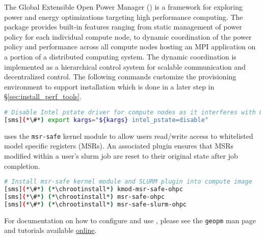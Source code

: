 The Global Extensible Open Power Manager (\GEOPM{}) is a framework for
exploring power and energy optimizations targeting high performance computing.
The \GEOPM{} package provides built-in features ranging from static management
of power policy for each individual compute node, to dynamic coordination of
the power policy and performance across all compute nodes hosting an MPI
application on a portion of a distributed computing system.  The dynamic
coordination is implemented as a hierarchical control system for scalable
communication and decentralized control. The following commands customize the
provisioning environment to support \GEOPM{} installation which is done in a
later step in \S\ref{sec:install_perf_tools}.

\begin{lstlisting}[language=bash,keywords={},upquote=true]
# Disable Intel pstate driver for compute nodes as it interferes with GEOPM's operation.
[sms](*\#*) export kargs="${kargs} intel_pstate=disable"
\end{lstlisting}

\noindent \GEOPM{} uses the \texttt{msr-safe} kernel module
to allow users read/write access to whitelisted model specific
registers (MSRs).  An associated \SLURM{} plugin ensures that MSRs modified
within a user's slurm job are reset to their original state after job completion.

\begin{lstlisting}[language=bash,keywords={},upquote=true]
# Install msr-safe kernel module and SLURM plugin into compute image
[sms](*\#*) (*\chrootinstall*) kmod-msr-safe-ohpc
[sms](*\#*) (*\chrootinstall*) msr-safe-ohpc
[sms](*\#*) (*\chrootinstall*) msr-safe-slurm-ohpc
\end{lstlisting}

\noindent For documentation on how to configure and use \GEOPM{}, please see
the \texttt{geopm} man page and tutorials
available \href{https://github.com/geopm/geopm/tree/dev/tutorial}{online}.

